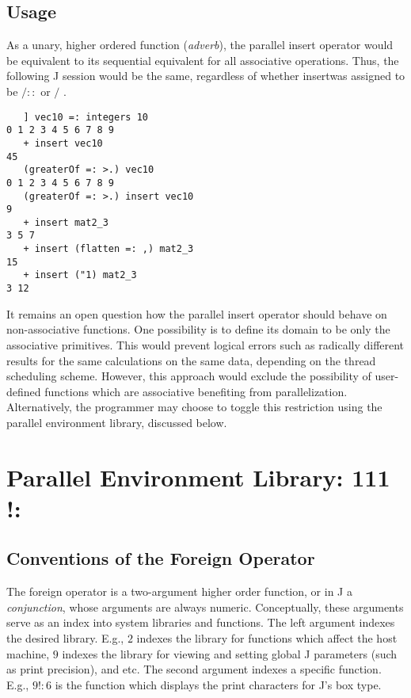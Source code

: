 \subsection{Usage}
As a unary, higher ordered function (\textit{adverb}), 
the parallel insert operator would be equivalent to its sequential equivalent 
for all associative operations. 
Thus, the following J session would be the same, 
regardless of whether \ttfamily insert\normalfont was assigned to be $/::$ or $/$ .

\begin{singlespacing}
\begin{small}
\begin{verbatim}
   ] vec10 =: integers 10
0 1 2 3 4 5 6 7 8 9
   + insert vec10
45
   (greaterOf =: >.) vec10
0 1 2 3 4 5 6 7 8 9
   (greaterOf =: >.) insert vec10
9
   + insert mat2_3
3 5 7
   + insert (flatten =: ,) mat2_3
15
   + insert ("1) mat2_3
3 12
\end{verbatim}
\end{small}
\end{singlespacing}

It remains an open question how the parallel insert operator should behave on non-associative functions.
One possibility is to define its domain to be only the associative primitives. 
This would prevent logical errors such as radically different results for the same calculations on the same data, 
depending on the thread scheduling scheme. 
However, this approach would exclude the possibility of 
user-defined functions which are associative benefiting from parallelization.
Alternatively, the programmer may choose to toggle this restriction using the parallel environment library, 
discussed below.

\section{Parallel Environment Library: 111 !:} 
\label{pfor}

\subsection{Conventions of the Foreign Operator}
The foreign operator is a two-argument higher order function, or in J a \textit{conjunction}, 
whose arguments are always numeric.
Conceptually, these arguments serve as an index into system libraries and functions.
The left argument indexes the desired library.
E.g., $2$ indexes the library for functions which affect the host machine, 
$9$ indexes the library for viewing and setting global J parameters (such as print precision), and etc.
The second argument indexes a specific function.
E.g., $9!:6$ is the function which displays the print characters for J's box type.

